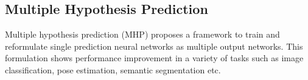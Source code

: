 \subsection{Multiple Hypothesis Prediction}
Multiple hypothesis prediction (MHP) \cite{rupprecht2017iccv} proposes a framework to train and reformulate single prediction neural networks as multiple output networks.  This formulation shows performance improvement in a variety of tasks such as image classification, pose estimation, semantic segmentation etc.